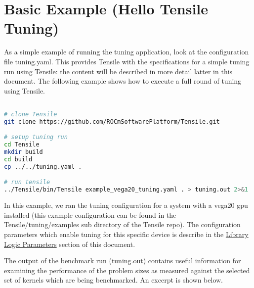 \documentclass[]{article}
\begin{document}
\section{Basic Example (Hello Tensile Tuning)}

As a simple example of running the tuning application, look at the configuration file tuning.yaml. This provides Tensile with the specifications for a simple tuning run using Tensile: the content will be described in more detail latter in this document. The following example shows how to execute a full round of tuning using Tensile.

\begin{lstlisting}[language=bash,breaklines=true]

# clone Tensile
git clone https://github.com/ROCmSoftwarePlatform/Tensile.git

# setup tuning run
cd Tensile
mkdir build
cd build
cp ../../tuning.yaml .

# run tensile
../Tensile/bin/Tensile example_vega20_tuning.yaml . > tuning.out 2>&1 
\end{lstlisting}

In this example, we ran the tuning configuration for a system with a vega20 gpu installed (this example configuration can be found in the Tensile/tuning/examples sub directory of the Tensile repo). The configuration parameters which enable tuning for this specific device is describe in the  \hyperref[sec:LibraryLogic]{Library  Logic Parameters} section of this document.

The output of the benchmark run (tuning.out) contains useful information for examining the performance of the problem sizes as measured against the selected set of kernels which are being benchmarked. An excerpt is shown below.
\end{document}
